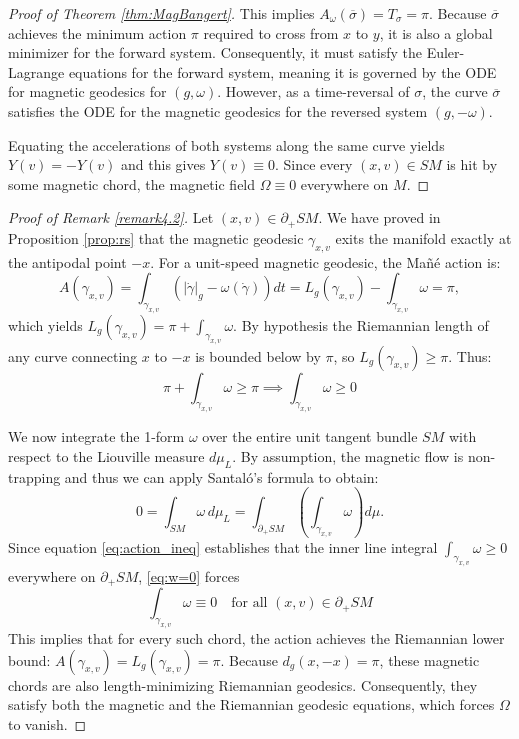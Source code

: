 \documentclass[12pt]{amsart}
\numberwithin{equation}{section}
\begin{document}
\begin{proof}[Proof of Theorem \ref{thm:MagBangert}]
This implies $A_\omega(\overline{\sigma}) = T_\sigma = \pi$. Because $\overline{\sigma}$ achieves the minimum action $\pi$ required to cross from $x$ to $y$, it is also a global minimizer for the forward system. Consequently, it must satisfy the Euler-Lagrange equations for the forward system, meaning it is governed by the ODE for magnetic geodesics for $(g, \omega)$.
However, as a time-reversal of $\sigma$, the curve $\overline{\sigma}$ satisfies the ODE for the magnetic geodesics for the reversed system $(g, -\omega)$.

Equating the accelerations of both systems along the same curve yields $Y(v) = -Y(v)$ and this gives $Y(v) \equiv 0$. Since every $(x,v)\in SM$ is hit by some magnetic chord, the magnetic field $\Omega \equiv 0$ everywhere on $M$.
\end{proof}

\begin{proof}[Proof of Remark \ref{remark4.2}]
Let $(x,v) \in \partial_+ SM$. We have proved in Proposition \ref{prop:rs} that the magnetic geodesic $\gamma_{x,v}$ exits the manifold exactly at the antipodal point $-x$. For a unit-speed magnetic geodesic, the Ma\~n\'e action is:
\begin{equation*}
    A(\gamma_{x,v}) = \int_{\gamma_{x,v}} \left( |\dot{\gamma}|_g - \omega(\dot{\gamma}) \right) dt = L_g(\gamma_{x,v}) - \int_{\gamma_{x,v}} \omega=\pi,
\end{equation*}
which yields $L_g(\gamma_{x,v}) = \pi + \int_{\gamma_{x,v}} \omega$. By hypothesis the Riemannian length of any curve connecting $x$ to $-x$ is bounded below by $\pi$, so $L_g(\gamma_{x,v}) \ge \pi$. Thus:
\begin{equation} \label{eq:action_ineq}
    \pi + \int_{\gamma_{x,v}} \omega \ge \pi \implies \int_{\gamma_{x,v}} \omega \ge 0
\end{equation}

We now integrate the 1-form $\omega$ over the entire unit tangent bundle $SM$ with respect to the Liouville measure $d\mu_L$. By assumption, the magnetic flow is non-trapping and thus we can apply Santal\'o's formula to obtain:
\begin{equation}
  0=  \int_{SM} \omega \, d\mu_L = \int_{\partial_+ SM} \left( \int_{\gamma_{x,v}} \omega \right) d\mu.\label{eq:w=0}
\end{equation}
Since equation \eqref{eq:action_ineq} establishes that the inner line integral $\int_{\gamma_{x,v}} \omega \ge 0$ everywhere on $\partial_+ SM$, \eqref{eq:w=0} forces
\begin{equation*}
    \int_{\gamma_{x,v}} \omega \equiv 0 \quad \text{for all } (x,v) \in \partial_+ SM
\end{equation*}
This implies that for every such chord, the action achieves the Riemannian lower bound: $A(\gamma_{x,v}) = L_g(\gamma_{x,v}) = \pi$. Because $d_g(x,-x) = \pi$, these magnetic chords are also length-minimizing Riemannian geodesics. Consequently, they satisfy both the magnetic and the Riemannian geodesic equations, which forces $\Omega$ to vanish.
\end{proof}
\end{document}
